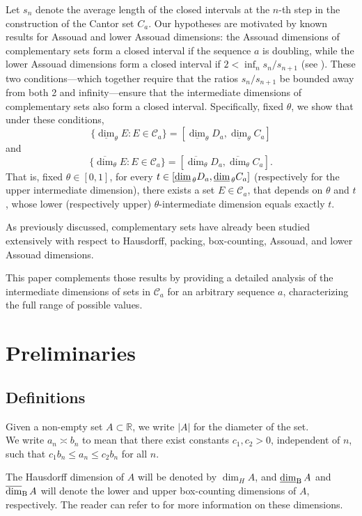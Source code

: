 \documentclass[11pt,reqno,bookmarksnumbered,raiselinks,breaklinks,colorlinks,plainpages]{amsart}
\newcommand\ubd{\overline{\mbox{\rm dim}}_{\rm B}\,} %
\newcommand\lbd{\underline{\mbox{\rm dim}}_{\rm B}\,} %
\newcommand\da{\underline{\mbox{\rm dim}}_{\,\theta}} %
\begin{document}
Let $s_n$ denote the average length of the closed intervals at the $n$-th step in the construction of the Cantor set $C_a$. Our hypotheses are motivated by known results for Assouad and lower Assouad dimensions: the Assouad dimensions of complementary sets form a closed interval if the sequence $a$ is doubling, while the lower Assouad dimensions form a closed interval if $2 < \inf_n s_n/s_{n+1}$ (see \cite{garcia2018assouad}). These two conditions—which together require that the ratios $s_n/s_{n+1}$ be bounded away from both 2 and infinity—ensure that the intermediate dimensions of complementary sets also form a closed interval. Specifically, fixed $\theta$, we show that under these conditions,
\[
\{ \underline{\dim}_\theta E : E \in \mathcal{C}_a \} = [\underline{\dim}_\theta D_a, \underline{\dim}_\theta C_a]
\]
and
\[
\{ \overline{\dim}_\theta E : E \in \mathcal{C}_a \} = [\overline{\dim}_\theta D_a, \overline{\dim}_\theta C_a].
\]
That is, fixed $\theta\in[0,1]$, for every $t\in[\da D_a,\da C_a]$ (respectively for the upper intermediate dimension), there exists a set $E \in \mathcal{C}_a$, that depends on $\theta$ and $t$, whose lower (respectively upper) $\theta$-intermediate dimension equals exactly $t$.

As previously discussed, complementary sets have already been studied extensively with respect to Hausdorff, packing, box-counting, Assouad, and lower Assouad dimensions. 

This paper complements those results by providing a detailed analysis of the intermediate dimensions of sets in 
$\mathcal{C}_a$  for an arbitrary sequence 
$a$, characterizing the full range of possible values.

\section{Preliminaries}



\subsection{Definitions}


Given a non-empty set $A \subset \mathbb{R}$, we write $|A|$ for the diameter of the set.\\ We write \(a_n \asymp b_n\) to mean that there exist constants \(c_1, c_2 > 0\), independent of \(n\), such that 
\(c_1 b_n \leq a_n \leq c_2 b_n\) for all \(n\).


The Hausdorff dimension of $A$ will be denoted by $\dim_H A$, and $\lbd A$ and $\ubd A$ will denote the lower and upper box-counting dimensions of $A$, respectively. The reader can refer to \cite{FBook} for more information on these dimensions.
\end{document}

